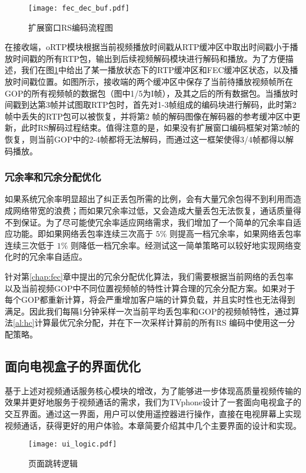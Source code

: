     \begin{figure}[htbp]
      \centering
      \texttt{[image: fec\_dec\_buf.pdf]}
      \caption{扩展窗口RS编码流程图}
      \label{fig:fec_dec_buf}
    \end{figure}

    在接收端，oRTP模块根据当前视频播放时间戳从RTP缓冲区中取出时间戳小于播放时间戳的所有RTP包，输出到后续视频解码模块进行解码和播放。为了方便描述，我们在图\ref{fig:fec_dec_buf}中给出了某一播放状态下的RTP缓冲区和FEC缓冲区状态，以及播放时间戳位置。如图所示，接收端的两个缓冲区中保存了当前待播放视频帧所在GOP的所有视频帧的数据包（图中1/5为I帧），及其之后的所有数据包。当播放时间戳到达第3帧并试图取RTP包时，首先对1-3帧组成的编码块进行解码，此时第2帧中丢失的RTP包可以被恢复，并将第2 帧的解码图像在解码器的参考缓冲区中更新，此时RS解码过程结束。值得注意的是，如果没有扩展窗口编码框架对第2帧的恢复，则当前GOP中的2-4帧都将无法解码，而通过这一框架使得3/4帧都得以解码播放。

    \subsubsection{冗余率和冗余分配优化}
    如果系统冗余率明显超出了纠正丢包所需的比例，会有大量冗余包得不到利用而造成网络带宽的浪费；而如果冗余率过低，又会造成大量丢包无法恢复，通话质量得不到保证。为了尽可能使冗余率适应网络需求，我们增加了一个简单的冗余率自适应功能。即如果网络丢包率连续三次高于 $5\%$ 则提高一档冗余率，如果网络丢包率连续三次低于 $1\%$ 则降低一档冗余率。经测试这一简单策略可以较好地实现网络变化时的冗余率自适应。

    针对第\ref{chap:fec}章中提出的冗余分配优化算法，我们需要根据当前网络的丢包率以及当前视频GOP中不同位置视频帧的特性计算合理的冗余分配方案。如果对于每个GOP都重新计算，将会严重增加客户端的计算负载，并且实时性也无法得到满足。因此我们每隔1分钟采样一次当前平均丢包率和GOP的视频帧特性，通过算法\ref{al:hc}计算最优冗余分配，并在下一次采样计算前的所有RS 编码中使用这一分配策略。


\subsection{面向电视盒子的界面优化}
基于上述对视频通话服务核心模块的增改，为了能够进一步体现高质量视频传输的效果并更好地服务于视频通话的需求，我们为TVphone设计了一套面向电视盒子的交互界面。通过这一界面，用户可以使用遥控器进行操作，直接在电视屏幕上实现视频通话，获得更好的用户体验。本章简要介绍其中几个主要界面的设计和实现。

\begin{figure}[htbp]
  \centering
  \texttt{[image: ui\_logic.pdf]}
  \caption{页面跳转逻辑}
  \label{fig:ui_logic}
\end{figure}

